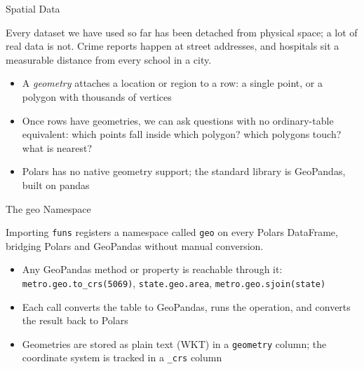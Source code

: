 \documentclass[8pt,aspectratio=169]{beamer}
\begin{document}
\begin{textframe}{Spatial Data}

Every dataset we have used so far has been detached from physical space; a lot of real data is not. Crime reports happen at street addresses, and hospitals sit a measurable distance from every school in a city.

\begin{itemize}
\item A \textit{geometry} attaches a location or region to a row: a single point, or a polygon with thousands of vertices
\item Once rows have geometries, we can ask questions with no ordinary-table equivalent: which points fall inside which polygon? which polygons touch? what is nearest?
\item Polars has no native geometry support; the standard library is GeoPandas, built on pandas
\end{itemize}

\end{textframe}

\begin{textframe}{The geo Namespace}

Importing \texttt{funs} registers a namespace called \texttt{geo} on every Polars DataFrame, bridging Polars and GeoPandas without manual conversion.

\begin{itemize}
\item Any GeoPandas method or property is reachable through it: \texttt{metro.geo.to\_crs(5069)}, \texttt{state.geo.area}, \texttt{metro.geo.sjoin(state)}
\item Each call converts the table to GeoPandas, runs the operation, and converts the result back to Polars
\item Geometries are stored as plain text (WKT) in a \texttt{geometry} column; the coordinate system is tracked in a \texttt{\_crs} column
\end{itemize}

\end{textframe}
\end{document}
